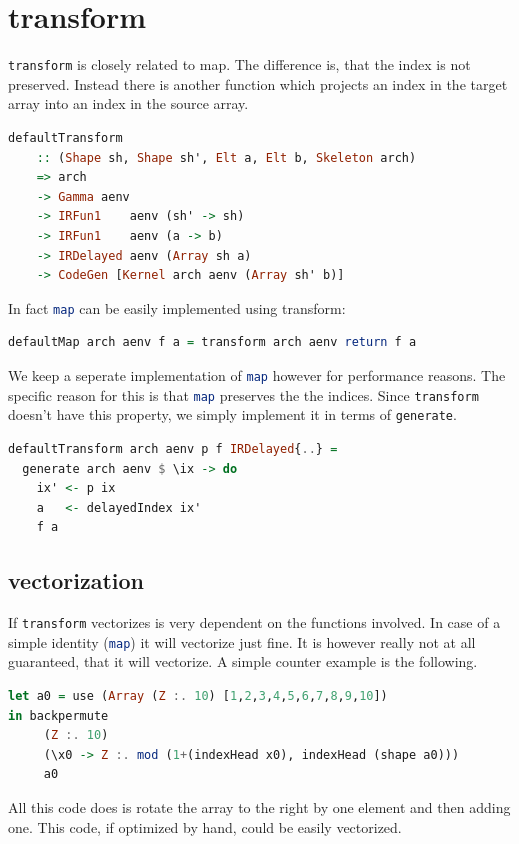 \documentclass[a4paper,bibliography=totocnumbered,parskip,headsepline]{scrbook}
\begin{document}
\section{transform}
\lstinline[language=haskell]!transform! is closely related to map.
The difference is, that the index is not preserved.
Instead there is another function which projects an index in the target array into an index in the source array.
\begin{lstlisting}[language=haskell]
defaultTransform
    :: (Shape sh, Shape sh', Elt a, Elt b, Skeleton arch)
    => arch
    -> Gamma aenv
    -> IRFun1    aenv (sh' -> sh)
    -> IRFun1    aenv (a -> b)
    -> IRDelayed aenv (Array sh a)
    -> CodeGen [Kernel arch aenv (Array sh' b)]
\end{lstlisting}
In fact \lstinline[language=haskell]!map! can be easily implemented using transform:
\begin{lstlisting}[language=haskell]
defaultMap arch aenv f a = transform arch aenv return f a
\end{lstlisting}
We keep a seperate implementation of \lstinline[language=haskell]!map! however for performance reasons.
The specific reason for this is that \lstinline[language=haskell]!map! preserves the the indices.
Since \lstinline[language=haskell]!transform! doesn't have this property, we simply implement it in terms of \lstinline[language=haskell]!generate!.
\begin{lstlisting}[language=haskell]
defaultTransform arch aenv p f IRDelayed{..} =
  generate arch aenv $ \ix -> do
    ix' <- p ix
    a   <- delayedIndex ix'
    f a
\end{lstlisting}

\subsection*{vectorization}
If \lstinline[language=haskell]!transform! vectorizes is very dependent on the functions involved.
In case of a simple identity (\lstinline[language=haskell]!map!) it will vectorize just fine.
It is however really not at all guaranteed, that it will vectorize.
A simple counter example is the following.
\begin{lstlisting}[language=haskell]
let a0 = use (Array (Z :. 10) [1,2,3,4,5,6,7,8,9,10])
in backpermute
     (Z :. 10)
     (\x0 -> Z :. mod (1+(indexHead x0), indexHead (shape a0)))
     a0
\end{lstlisting}
All this code does is rotate the array to the right by one element and then adding one.
This code, if optimized by hand, could be easily vectorized.
\end{document}

